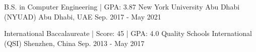 

\begin{cventries}

  \cventry
    {B.S. in Computer Engineering | GPA: 3.87} %
    {New York University Abu Dhabi (NYUAD)} %
    {Abu Dhabi, UAE} %
    {Sep. 2017 - May 2021} %
    {
      \begin{cvitems} %
      \end{cvitems}
    }

  \cventry
    {International Baccalaureate | Score: 45 | GPA: 4.0} %
    {Quality Schools International (QSI)} %
    {Shenzhen, China} %
    {Sep. 2013 - May 2017} %
    {
      \begin{cvitems} %
      \end{cvitems}
    }

\end{cventries}
